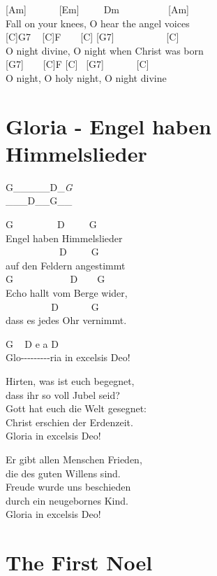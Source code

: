 \documentclass[
  letterpaper,
]{scrbook}
\begin{document}
{[}Am{]} ~ ~ ~ ~{[}Em{]} ~ ~ ~Dm ~ ~ ~ ~ ~ ~{[}Am{]}\\
Fall on your knees, O hear the angel voices\\
{[}C{]}G7 ~ {[}C{]}F ~ ~ {[}C{]} {[}G7{]} ~ ~ ~ ~ ~ ~ {[}C{]}\\
O night divine, O night when Christ was born\\
{[}G7{]} ~ ~ {[}C{]}F {[}C{]} ~{[}G7{]} ~ ~ ~ ~{[}C{]}\\
O night, O holy night, O night divine

\hypertarget{gloria---engel-haben-himmelslieder}{%
\chapter{Gloria - Engel haben
Himmelslieder}\label{gloria---engel-haben-himmelslieder}}

\textbar G\_\_\_\_\_\textbar D\_\emph{G\textbf{\textbar{}\\
\textbar{}}}\_\_\_\textbar D\_\_G\_\_\textbar{}

G ~ ~ ~ ~ ~ D ~ ~ ~G\\
Engel haben Himmelslieder\\
\hspace*{0.333em} ~ ~ ~ ~ ~ ~ ~D ~ ~ ~G\\
auf den Feldern angestimmt\\
G ~ ~ ~ ~ ~ ~ ~D ~ ~ G\\
Echo hallt vom Berge wider,\\
\hspace*{0.333em} ~ ~ ~ ~ ~ ~D ~ ~ ~ ~G\\
dass es jedes Ohr vernimmt.

G ~ D e a D\\
Glo-\/-\/-\/-\/-\/-\/-\/-\/-ria in excelsis Deo!

Hirten, was ist euch begegnet,\\
dass ihr so voll Jubel seid?\\
Gott hat euch die Welt gesegnet:\\
Christ erschien der Erdenzeit.\\
Gloria in excelsis Deo!

Er gibt allen Menschen Frieden,\\
die des guten Willens sind.\\
Freude wurde uns beschieden\\
durch ein neugebornes Kind.\\
Gloria in excelsis Deo!

\hypertarget{the-first-noel}{%
\chapter{The First Noel}\label{the-first-noel}}
\end{document}
